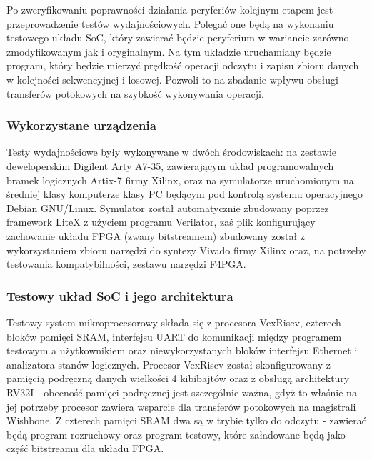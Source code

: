 Po zweryfikowaniu poprawności działania peryferiów kolejnym etapem jest przeprowadzenie testów wydajnościowych. Polegać one będą na wykonaniu testowego układu SoC, który zawierać będzie peryferium w wariancie zarówno zmodyfikowanym jak i oryginalnym. Na tym układzie uruchamiany będzie program, który będzie mierzyć prędkość operacji odczytu i zapisu zbioru danych w kolejności sekwencyjnej i losowej. Pozwoli to na zbadanie wpływu obsługi transferów potokowych na szybkość wykonywania operacji.

\subsubsection{Wykorzystane urządzenia}

Testy wydajnościowe były wykonywane w dwóch środowiskach: na zestawie deweloperskim Digilent Arty A7-35\cite{digilent-arty-a7}, zawierającym układ programowalnych bramek logicznych Artix-7 firmy Xilinx, oraz na symulatorze uruchomionym na średniej klasy komputerze klasy PC będącym pod kontrolą systemu operacyjnego Debian GNU/Linux\cite{debian11}. Symulator został automatycznie zbudowany poprzez framework LiteX z użyciem programu Verilator, zaś plik konfigurujący zachowanie układu FPGA (zwany bitstreamem) zbudowany został z wykorzystaniem zbioru narzędzi do syntezy Vivado\cite{vivado2019.1} firmy Xilinx oraz, na potrzeby testowania kompatybilności, zestawu narzędzi F4PGA\cite{f4pga}.


\subsubsection{Testowy układ SoC i jego architektura}

Testowy system mikroprocesorowy składa się z procesora VexRiscv, czterech bloków pamięci SRAM, interfejsu UART do komunikacji między programem testowym a użytkownikiem oraz niewykorzystanych bloków interfejsu Ethernet i analizatora stanów logicznych.
Procesor VexRiscv został skonfigurowany z pamięcią podręczną danych wielkości 4 kibibajtów oraz z obsługą architektury RV32I - obecność pamięci podręcznej jest szczególnie ważna, gdyż to właśnie na jej potrzeby procesor zawiera wsparcie dla transferów potokowych na magistrali Wishbone.
Z czterech pamięci SRAM dwa są w trybie tylko do odczytu - zawierać będą program rozruchowy oraz program testowy, które załadowane będą jako część bitstreamu dla układu FPGA.

